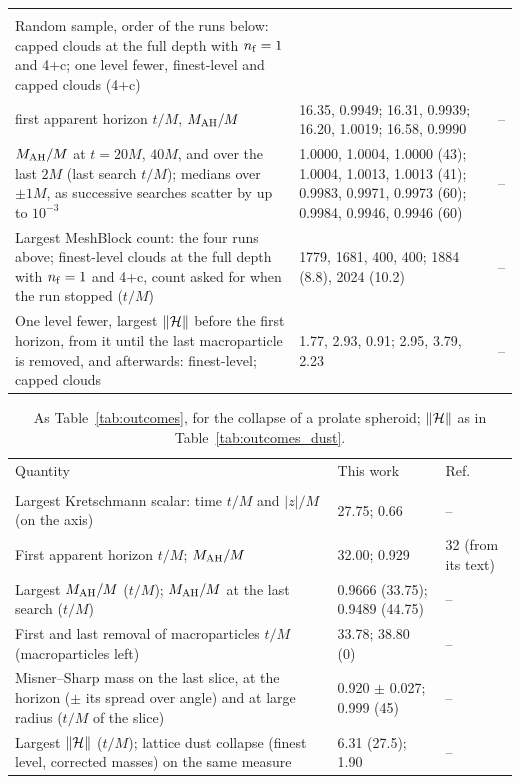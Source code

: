 \begin{table}
\begin{ruledtabular}
\begin{tabular}{p{}p{}p{}}
\colrule
\multicolumn{3}{l}{\textit{Dust collapse from a random sample}} \tabularnewline
\raggedright Random sample, order of the runs below: capped clouds at the full depth with $n_{\rm f}=1$ and 4+c; one level fewer, finest-level and capped clouds (4+c) & \raggedright  & \raggedright  \tabularnewline
\raggedright \quad first apparent horizon $t/M$, $M_{\rm AH}/M$ & \raggedright 16.35, 0.9949; 16.31, 0.9939; 16.20, 1.0019; 16.58, 0.9990 & \raggedright -- \tabularnewline
\raggedright \quad $M_{\rm AH}/M$ at $t=20M$, $40M$, and over the last $2M$ (last search $t/M$); medians over $\pm1M$, as successive searches scatter by up to $10^{-3}$ & \raggedright 1.0000, 1.0004, 1.0000 (43); 1.0004, 1.0013, 1.0013 (41); 0.9983, 0.9971, 0.9973 (60); 0.9984, 0.9946, 0.9946 (60) & \raggedright -- \tabularnewline
\raggedright Largest MeshBlock count: the four runs above; finest-level clouds at the full depth with $n_{\rm f}=1$ and 4+c, count asked for when the run stopped ($t/M$) & \raggedright 1779, 1681, 400, 400; 1884 (8.8), 2024 (10.2) & \raggedright -- \tabularnewline
\raggedright One level fewer, largest $\|\mathcal{H}\|$ before the first horizon, from it until the last macroparticle is removed, and afterwards: finest-level; capped clouds & \raggedright 1.77, 2.93, 0.91; 2.95, 3.79, 2.23 & \raggedright -- \tabularnewline
\end{tabular}
\end{ruledtabular}
\end{table}

\begin{table}
\caption{As Table~\ref{tab:outcomes}, for the collapse of a prolate spheroid; $\|\mathcal{H}\|$ as in Table~\ref{tab:outcomes_dust}.}
\label{tab:outcomes_prolate}
\footnotesize
\setlength{\tabcolsep}{3pt}
\begin{ruledtabular}
\begin{tabular}{p{}p{}p{}}
Quantity & This work & Ref.~\cite{Wu:2026nrpic} \tabularnewline
\colrule
\multicolumn{3}{l}{\textit{Prolate collapse}} \tabularnewline
\raggedright Largest Kretschmann scalar: time $t/M$ and $|z|/M$ (on the axis) & \raggedright 27.75; 0.66 & \raggedright -- \tabularnewline
\raggedright First apparent horizon $t/M$; $M_{\rm AH}/M$ & \raggedright 32.00; 0.929 & \raggedright 32 (from its text) \tabularnewline
\raggedright Largest $M_{\rm AH}/M$ ($t/M$); $M_{\rm AH}/M$ at the last search ($t/M$) & \raggedright 0.9666 (33.75); 0.9489 (44.75) & \raggedright -- \tabularnewline
\raggedright First and last removal of macroparticles $t/M$ (macroparticles left) & \raggedright 33.78; 38.80 (0) & \raggedright -- \tabularnewline
\raggedright Misner--Sharp mass on the last slice, at the horizon ($\pm$ its spread over angle) and at large radius ($t/M$ of the slice) & \raggedright 0.920 $\pm$ 0.027; 0.999 (45) & \raggedright -- \tabularnewline
\raggedright Largest $\|\mathcal{H}\|$ ($t/M$); lattice dust collapse (finest level, corrected masses) on the same measure & \raggedright 6.31 (27.5); 1.90 & \raggedright -- \tabularnewline
\end{tabular}
\end{ruledtabular}
\end{table}

